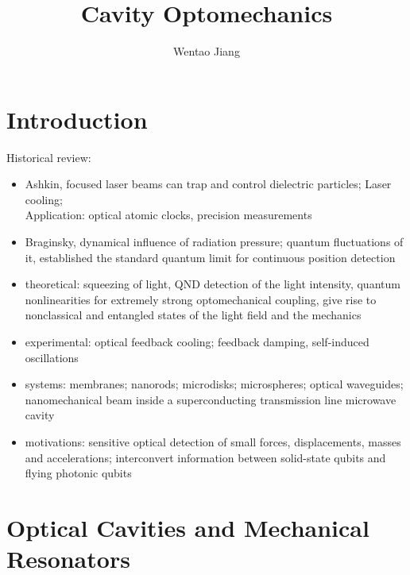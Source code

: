 \documentclass[8pt,a4paper,twocolumn]{article} %
\numberwithin{equation}{section} %
\begin{document}
\small
	\title{Cavity Optomechanics}
	\author{Wentao Jiang}
	\date{}
	\maketitle
	\tableofcontents

	\section{Introduction} %
	\label{sec:introduction}
		Historical review:
		\begin{itemize}
    \setlength{\itemsep}{0.5pt}
    \setlength{\parsep}{0.5pt}
    \setlength{\parskip}{0.5pt}
			\item Ashkin, focused laser beams can trap and control dielectric particles; Laser cooling; \\
			Application: optical atomic clocks, precision measurements
			\item Braginsky, dynamical influence of radiation pressure; quantum fluctuations of it, established the standard quantum limit for continuous position detection
			\item theoretical: squeezing of light, QND detection of the light intensity, quantum nonlinearities for extremely strong optomechanical coupling, give rise to nonclassical and entangled states of the light field and the mechanics
			\item experimental: optical feedback cooling; feedback damping, self-induced oscillations
			\item systems: membranes; nanorods; microdisks; microspheres; optical waveguides; nanomechanical beam inside a superconducting transmission line microwave cavity
			\item motivations: sensitive optical detection of small forces, displacements, masses and accelerations; interconvert information between solid-state qubits and flying photonic qubits
		\end{itemize}

	\section{Optical Cavities and Mechanical Resonators} %
	\label{sec:optical_cavities_and_mechanical_resonators}
		

\end{document}
